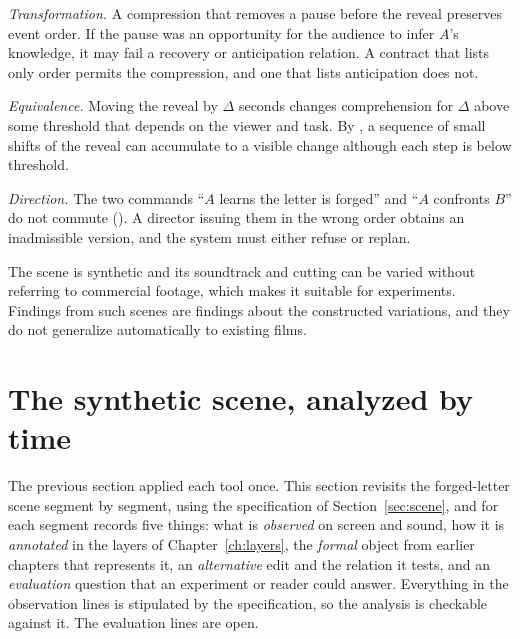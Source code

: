 \emph{Transformation.} A compression that removes a pause before the reveal preserves event order. If the pause was an opportunity for the audience to infer $A$'s knowledge, it may fail a recovery or anticipation relation. A contract that lists only order permits the compression, and one that lists anticipation does not.

\emph{Equivalence.} Moving the reveal by $\Delta$ seconds changes comprehension for $\Delta$ above some threshold that depends on the viewer and task. By , a sequence of small shifts of the reveal can accumulate to a visible change although each step is below threshold.

\emph{Direction.} The two commands ``$A$ learns the letter is forged'' and ``$A$ confronts $B$'' do not commute (). A director issuing them in the wrong order obtains an inadmissible version, and the system must either refuse or replan.

The scene is synthetic and its soundtrack and cutting can be varied without referring to commercial footage, which makes it suitable for experiments. Findings from such scenes are findings about the constructed variations, and they do not generalize automatically to existing films.

\section{The synthetic scene, analyzed by time}\label{sec:timeindexed}

The previous section applied each tool once. This section revisits the forged-letter scene segment by segment, using the specification of Section~\ref{sec:scene}, and for each segment records five things: what is \emph{observed} on screen and sound, how it is \emph{annotated} in the layers of Chapter~\ref{ch:layers}, the \emph{formal} object from earlier chapters that represents it, an \emph{alternative} edit and the relation it tests, and an \emph{evaluation} question that an experiment or reader could answer. Everything in the observation lines is stipulated by the specification, so the analysis is checkable against it. The evaluation lines are open.

